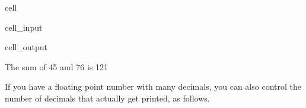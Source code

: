 \documentclass[letterpaper,10pt,english]{jupyterBook}
\begin{document}
\begin{sphinxuseclass}{cell}\begin{sphinxVerbatimInput}

\begin{sphinxuseclass}{cell_input}
\begin{sphinxVerbatim}[commandchars=\\\{\}]
  
  
  
\end{sphinxVerbatim}

\end{sphinxuseclass}\end{sphinxVerbatimInput}
\begin{sphinxVerbatimOutput}

\begin{sphinxuseclass}{cell_output}
\begin{sphinxVerbatim}[commandchars=\\\{\}]
The sum of 45 and 76 is 121
\end{sphinxVerbatim}

\end{sphinxuseclass}\end{sphinxVerbatimOutput}

\end{sphinxuseclass}
\sphinxAtStartPar
If you have a floating point number with many decimals, you can also control the number of decimals that actually get printed, as follows.
\end{document}

